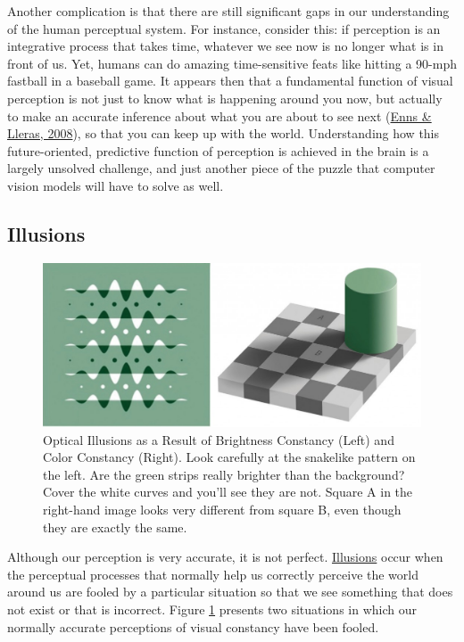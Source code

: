 \documentclass[
]{krantz}
\begin{document}
Another complication is that there are still significant gaps in our understanding of the human perceptual system. For instance, consider this: if perception is an integrative process that takes time, whatever we see now is no longer what is in front of us. Yet, humans can do amazing time-sensitive feats like hitting a 90-mph fastball in a baseball game. It appears then that a fundamental function of visual perception is not just to know what is happening around you now, but actually to make an accurate inference about what you are about to see next (\protect\hyperlink{ref-Enns2008}{Enns \& Lleras, 2008}), so that you can keep up with the world. Understanding how this future-oriented, predictive function of perception is achieved in the brain is a largely unsolved challenge, and just another piece of the puzzle that computer vision models will have to solve as well.

\hypertarget{illusions}{%
\subsection*{Illusions}\label{illusions}}


\begin{figure}

{\centering \includegraphics[width=0.6\linewidth]{images/ch2/fig4} 

}

\caption{Optical Illusions as a Result of Brightness Constancy (Left) and Color Constancy (Right). Look carefully at the snakelike pattern on the left. Are the green strips really brighter than the background? Cover the white curves and you’ll see they are not. Square A in the right-hand image looks very different from square B, even though they are exactly the same.}\label{fig:constancy}
\end{figure}

Although our perception is very accurate, it is not perfect. \protect\hyperlink{illusions}{Illusions} occur when the perceptual processes that normally help us correctly perceive the world around us are fooled by a particular situation so that we see something that does not exist or that is incorrect. Figure \ref{fig:constancy} presents two situations in which our normally accurate perceptions of visual constancy have been fooled.
\end{document}
